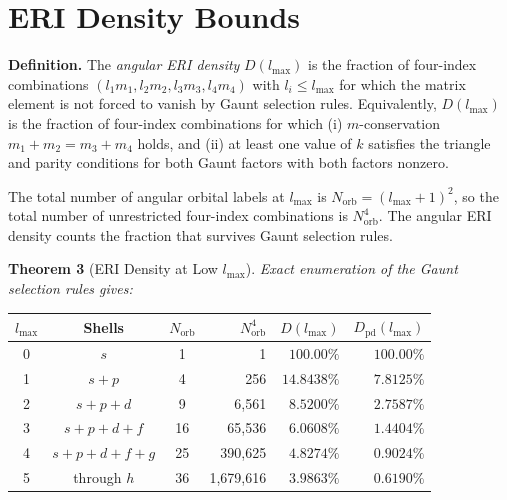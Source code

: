 \documentclass[twocolumn,pra,amsmath,amssymb,superscriptaddress]{revtex4-2}
\begin{document}
\section{ERI Density Bounds}
\label{sec:bounds}

\noindent\textbf{Definition.}  The \textit{angular ERI density}
$D(l_{\max})$ is the fraction of four-index combinations
$(l_1 m_1, l_2 m_2, l_3 m_3, l_4 m_4)$ with $l_i \leq l_{\max}$
for which the matrix element is not forced to vanish by Gaunt
selection rules.  Equivalently, $D(l_{\max})$ is the fraction of
four-index combinations for which (i) $m$-conservation
$m_1 + m_2 = m_3 + m_4$ holds, and (ii) at least one value of $k$
satisfies the triangle and parity conditions for both Gaunt factors
with both factors nonzero.

The total number of angular orbital labels at $l_{\max}$ is
$N_{\mathrm{orb}} = (l_{\max} + 1)^2$, so the total number of
unrestricted four-index combinations is $N_{\mathrm{orb}}^4$.  The
angular ERI density counts the fraction that survives Gaunt
selection rules.

\medskip
\noindent\textbf{Theorem 3} (ERI Density at Low $l_{\max}$).
\textit{Exact enumeration of the Gaunt selection rules gives:}

\begin{center}
\begin{tabular}{cccrrr}
\toprule
$l_{\max}$ & Shells & $N_{\mathrm{orb}}$ & $N_{\mathrm{orb}}^4$ & $D(l_{\max})$ & $D_{\mathrm{pd}}(l_{\max})$ \\
\midrule
0 & $s$                 & 1  &           1 & $100.00\%$ & $100.00\%$ \\
1 & $s + p$             & 4  &         256 & $14.8438\%$ & $7.8125\%$ \\
2 & $s + p + d$         & 9  &       6{,}561 & $8.5200\%$ & $2.7587\%$ \\
3 & $s + p + d + f$     & 16 &      65{,}536 & $6.0608\%$ & $1.4404\%$ \\
4 & $s + p + d + f + g$ & 25 &     390{,}625 & $4.8274\%$ & $0.9024\%$ \\
5 & through $h$         & 36 &   1{,}679{,}616 & $3.9863\%$ & $0.6190\%$ \\
\bottomrule
\end{tabular}
\end{center}
\end{document}
